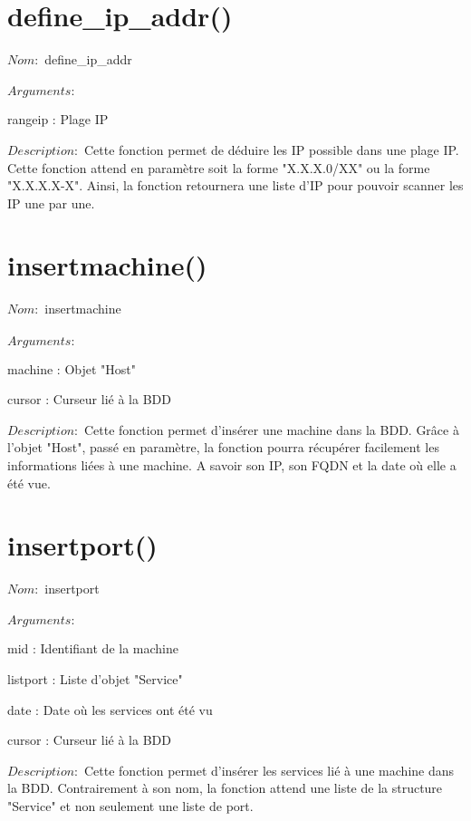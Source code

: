 \documentclass[12pt]{report}
\begin{document}
		\section{define\_ip\_addr()}
			{\setlength{\parindent}{0cm}
			$Nom :$ define\_ip\_addr\\\\
			}
			$Arguments :$
			\begin{description}
				\item rangeip : Plage IP\\
			\end{description}
			$Description : $ Cette fonction permet de déduire les IP possible dans une plage IP. Cette fonction attend en paramètre soit la forme "X.X.X.0/XX" ou la forme "X.X.X.X-X". Ainsi, la fonction retournera une liste d'IP pour pouvoir scanner les IP une par une.
		\section{insertmachine()}
			{\setlength{\parindent}{0cm}
			$Nom :$ insertmachine\\\\
			}
			$Arguments :$
			\begin{description}
				\item machine : Objet "Host"
				\item cursor : Curseur lié à la BDD\\
			\end{description}
			$Description : $ Cette fonction permet d'insérer une machine dans la BDD. Grâce à l'objet "Host", passé en paramètre, la fonction pourra récupérer facilement les informations liées à une machine. A savoir son IP, son FQDN et la date où elle a été vue.
		\section{insertport()}
			{\setlength{\parindent}{0cm}
			$Nom :$ insertport\\\\
			}
			$Arguments :$
			\begin{description}
				\item mid : Identifiant de la machine
				\item listport : Liste d'objet "Service"
				\item date : Date où les services ont été vu
				\item cursor : Curseur lié à la BDD\\
			\end{description}
			$Description : $ Cette fonction permet d'insérer les services lié à une machine dans la BDD. Contrairement à son nom, la fonction attend une liste de la structure "Service" et non seulement une liste de port.
\end{document}
